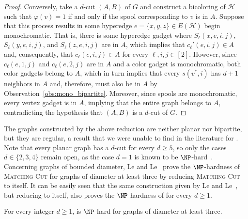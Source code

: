 \begin{proof}
    Conversely, take a $d$-cut $(A, B)$ of $G$ and construct a bicoloring of $\mathcal{H}$ such that $\varphi(v) = 1$ if and only if the spool corresponding to $v$ is in $A$.
    Suppose that this process results in some hyperedge $e = \{x, y, z\} \in E(\mathcal{H})$ begin monochromatic.
    That is, there is some hyperedge gadget where $S_{\ell}(x, e, i, j)$, $S_{\ell}(y, e, i, j)$, and $S_{\ell}(z, e, i, j)$ are in $A$, which implies that $c_{\ell}'(e, i, j) \in A$ and, consequently, that $c_{\ell}(e, i, j) \in A$ for every $\ell,i,j \in [2]$.
    However, since $c_{\ell}(e, 1, j)$ and $c_{\ell}(e, 2, j)$ are in $A$ and a color gadget is monochromatic, both color gadgets belong to $A$, which in turn implies that every $s(v^*, i)$ has $d+1$ neighbors in $A$ and, therefore, must also be in $A$ by Observation~\ref{obs:mono_bipartite}.
    Moreover, since spools are monochromatic, every vertex gadget is in $A$, implying that the entire graph belongs to $A$, contradicting the hypothesis that $(A, B)$ is a $d$-cut of $G$.
\end{proof}


The graphs constructed by the above reduction are neither planar nor bipartite, but they are regular, a result that we were unable to find in the literature for .
Note that every planar graph has a $d$-cut for every $d \geq 5$, so only the cases $d \in \{2,3,4\}$ remain open, as the case $d=1$ is known to be $\NP$-hard~\cite{matching_cut_planar}. %
Concerning graphs of bounded diameter, Le and Le~\cite{matching_cut_diameter} prove the $\NP$-hardness of \textsc{Matching Cut} for graphs of diameter at least three by reducing \textsc{Matching Cut} to itself.  It can be easily seen that the same construction given by Le and Le~\cite{matching_cut_diameter}, but reducing   to itself, also proves the $\NP$-hardness of  for every $d \geq 1$. %


\begin{corollary}
    For every integer $d \geq 1$,  is $\NP$-hard for graphs of diameter at least three.
\end{corollary}

